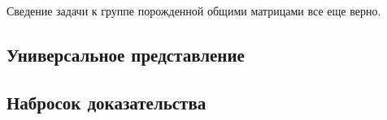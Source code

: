 Сведение задачи к группе порожденной общими матрицами все еще верно.

\subsection{Универсальное представление}\label{subsec:char-4-universal}

\subsection{Набросок доказательства}\label{subsec:char-4-non-injective}